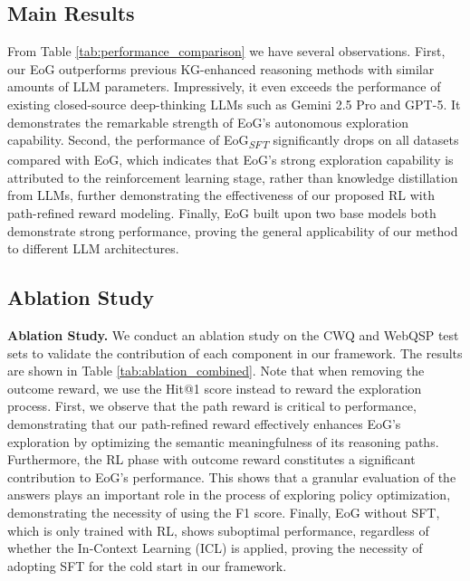 \subsection{Main Results}
From Table \ref{tab:performance_comparison} we have several observations.
First, our EoG outperforms previous KG-enhanced reasoning methods with similar amounts of LLM parameters. 
Impressively, it even exceeds the performance of existing closed-source deep-thinking LLMs such as Gemini 2.5 Pro and GPT-5.
It demonstrates the remarkable  strength of EoG's autonomous exploration capability.
Second, the performance of EoG\textsubscript{\textit{SFT}} significantly drops on all datasets compared with EoG,
which indicates that EoG's strong exploration capability is attributed to the reinforcement learning stage, rather than knowledge distillation from LLMs, further demonstrating the effectiveness of our proposed RL with path-refined reward modeling.
Finally, EoG built upon two base models both demonstrate strong performance, proving the general applicability of our method to different LLM architectures.



\subsection{Ablation Study}
\textbf{Ablation Study.} We conduct an ablation study on the CWQ and WebQSP test sets to validate the contribution of each component in our framework. 
The results are shown in Table \ref{tab:ablation_combined}.
Note that when removing the outcome reward, we use the Hit@1 score instead to reward the exploration process.
First, we observe that the path reward is critical to performance, demonstrating that our path-refined reward effectively enhances EoG's exploration by optimizing the semantic meaningfulness of its reasoning paths.
Furthermore, the RL phase with outcome reward constitutes
a significant contribution to EoG's performance.
This shows that a granular evaluation of the answers plays an important role in the process of exploring policy optimization, demonstrating the necessity of using the F1 score.
Finally, EoG without SFT, which is only trained with RL, 
shows suboptimal performance, regardless of whether the In-Context Learning (ICL) is applied, 
proving the necessity of adopting SFT 
for the cold start in our framework.

